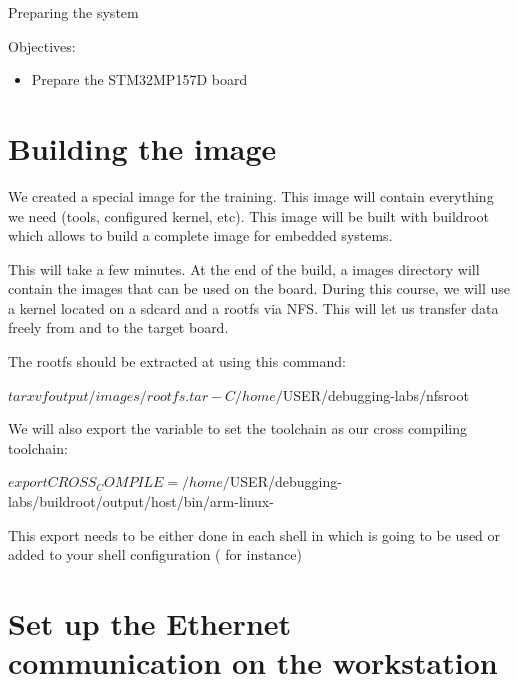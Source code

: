 \subchapter
{Preparing the system}
{Objectives:
  \begin{itemize}
    \item Prepare the STM32MP157D board
  \end{itemize}
}

\section{Building the image}

We created a special image for the training. This image will contain everything
we need (tools, configured kernel, etc). This image will be built with buildroot
which allows to build a complete image for embedded systems.


This will take a few minutes. At the end of the build, a images directory will
contain the images that can be used on the board. During this course, we will
use a kernel located on a sdcard and a rootfs via NFS. This will let us transfer
data freely from and to the target board.

The rootfs should be extracted at 
using this command:

\begin{bashinput}
$ tar xvf output/images/rootfs.tar -C /home/$USER/debugging-labs/nfsroot
\end{bashinput}

We will also export the  variable to set the toolchain as our
cross compiling toolchain:

\begin{bashinput}
$ export CROSS_COMPILE=/home/$USER/debugging-labs/buildroot/output/host/bin/arm-linux-
\end{bashinput}

This export needs to be either done in each shell in which  is
going to be used or added to your shell configuration ( for
instance)



\section{Set up the Ethernet communication on the workstation}

